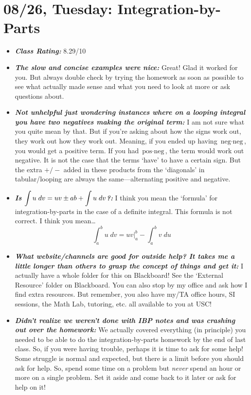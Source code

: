 \documentclass[11pt,letterpaper]{article}
\begin{document}
\newpage
\section*{08/26, Tuesday: Integration-by-Parts\label{08-26}}

\begin{itemize}
\item {\bfseries\itshape Class Rating:} 8.29/10

\item {\bfseries\itshape The slow and concise examples were nice:} Great! Glad it worked for you. But always double check by trying the homework as soon as possible to see what actually made sense and what you need to look at more or ask questions about. 

\item {\bfseries\itshape Not unhelpful just wondering instances where on a looping integral you have two negatives making the original term:} I am not sure what you quite mean by that. But if you're asking about how the signs work out, they work out how they work out. Meaning, if you ended up having $\text{neg} \cdot \text{neg}$, you would get a positive term. If you had $\text{pos} \cdot \text{neg}$, the term would work out negative. It is not the case that the terms `have' to have a certain sign. But the extra $+/-$ added in these products from the `diagonals' in tabular/looping are always the same---alternating positive and negative. 

\item {\bfseries\itshape Is $\displaystyle \int u \;dv= uv \pm ab + \int u \;dv$?:} I think you mean the `formula' for integration-by-parts in the case of a definite integral. This formula is not correct. I think you mean\dots
	\[
	\int_a^b u \;dv= uv \bigg|_a^b - \int_a^b v \;du
	\]

\item {\bfseries\itshape What website/channels are good for outside help? It takes me a little longer than others to grasp the concept of things and get it:} I actually have a whole folder for this on Blackboard! See the `External Resource' folder on Blackboard. You can also stop by my office and ask how I find extra resources. But remember, you also have my/TA office hours, SI sessions, the Math Lab, tutoring, etc. all available to you at USC!

\item {\bfseries\itshape Didn't realize we weren't done with IBP notes and was crashing out over the homework:} We actually covered everything (in principle) you needed to be able to do the integration-by-parts homework by the end of last class. So, if you were having trouble, perhaps it is time to ask for some help! Some struggle is normal and expected, but there is a limit before you should ask for help. So, spend some time on a problem but \textit{never} spend an hour or more on a single problem. Set it aside and come back to it later or ask for help on it!


\end{itemize}
\end{document}
